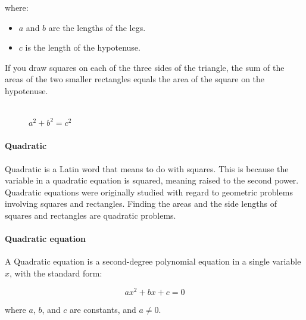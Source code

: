 \documentclass[12pt]{article}
\begin{document}
{where:
\begin{itemize}
    \item \( a \) and \( b \) are the lengths of the legs.
    \item \( c \) is the length of the hypotenuse.
\end{itemize}

If you draw squares on each of the three sides of the triangle, the sum of the areas of the two smaller rectangles equals the area of the square on the hypotenuse.

\begin{figure}[h!]
    \centering
    \\ \boldmath \Large{$a^2 + b^2 = c^2$} \unboldmath
\end{figure}


\paragraph{Quadratic}
Quadratic is a Latin word that means to do with squares. This is because the variable in a quadratic equation is squared, meaning raised to the second power. Quadratic equations were originally studied with regard to geometric problems involving squares and rectangles. Finding the areas and the side lengths of squares and rectangles are quadratic problems.

\paragraph{Quadratic equation}
A Quadratic equation is a second-degree polynomial equation in a single variable \(x\), with the standard form:

{\Large $$ax^2 + bx + c = 0$$}

where \(a\), \(b\), and \(c\) are constants, and \(a \neq 0\).

}
\end{document}
